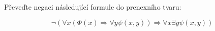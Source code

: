 \subsubsection{}
Převeďte negaci následující formule do prenexního tvaru:

$$\neg(\forall x (\Phi (x) \Rightarrow \forall y \psi(x,y)) \Rightarrow \forall
x \exists y \psi(x,y))$$
